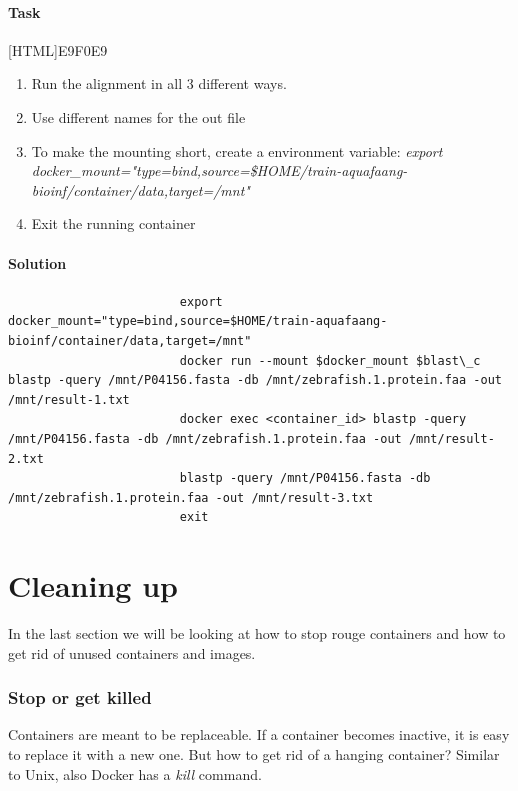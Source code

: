 \documentclass[12pt]{article}
\begin{document}
			\paragraph{Task}
				[HTML]{E9F0E9}{\parbox{\linewidth}{%
						\begin{enumerate}
							\item Run the alignment in all 3 different ways.
							\item Use different names for the out file
							\item To make the mounting short, create a environment variable:
							\textit{export docker\_mount="type=bind,source=\$HOME/train-aquafaang-bioinf/container/data,target=/mnt"}
							\item Exit the running container
						\end{enumerate}
				}}

			\paragraph{Solution}	
	
				\begin{minipage}{\linewidth}
					\begin{lstlisting}
						export docker_mount="type=bind,source=$HOME/train-aquafaang-bioinf/container/data,target=/mnt"
						docker run --mount $docker_mount $blast\_c blastp -query /mnt/P04156.fasta -db /mnt/zebrafish.1.protein.faa -out /mnt/result-1.txt
						docker exec <container_id> blastp -query /mnt/P04156.fasta -db /mnt/zebrafish.1.protein.faa -out /mnt/result-2.txt
						blastp -query /mnt/P04156.fasta -db /mnt/zebrafish.1.protein.faa -out /mnt/result-3.txt
						exit
					\end{lstlisting}
				\end{minipage}
				
			
			\section{Cleaning up}
				In the last section we will be looking at how to stop rouge containers and how to get rid of unused containers and images.
			
				\subsubsection{Stop or get killed}
					Containers are meant to be replaceable. 
					If a container becomes inactive, it is easy to replace it with a new one. 
					But how to get rid of a hanging container? 
					Similar to Unix, also Docker has a \textit{kill} command.
\end{document}

